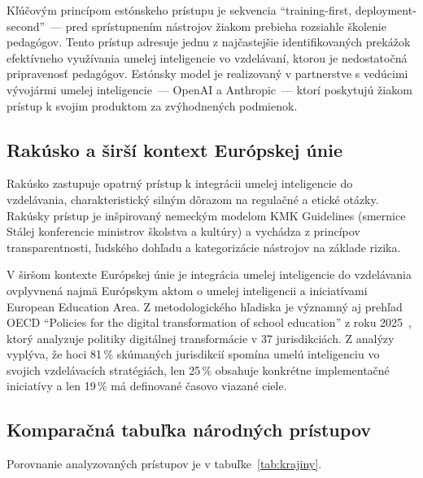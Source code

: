 Kľúčovým princípom estónskeho prístupu je sekvencia \enquote{training-first, deployment-second}~--- pred sprístupnením nástrojov žiakom prebieha rozsiahle školenie pedagógov. Tento prístup adresuje jednu z najčastejšie identifikovaných prekážok efektívneho využívania umelej inteligencie vo vzdelávaní, ktorou je nedostatočná pripravenosť pedagógov. Estónsky model je realizovaný v partnerstve s vedúcimi vývojármi umelej inteligencie~--- OpenAI a Anthropic~--- ktorí poskytujú žiakom prístup k svojim produktom za zvýhodnených podmienok.


\subsection{Rakúsko a širší kontext Európskej únie}

Rakúsko zastupuje opatrný prístup k integrácii umelej inteligencie do vzdelávania, charakteristický silným dôrazom na regulačné a etické otázky. Rakúsky prístup je inšpirovaný nemeckým modelom KMK Guidelines (smernice Stálej konferencie ministrov školstva a kultúry) a vychádza z princípov transparentnosti, ľudského dohľadu a kategorizácie nástrojov na základe rizika.

V širšom kontexte Európskej únie je integrácia umelej inteligencie do vzdelávania ovplyvnená najmä Európskym aktom o umelej inteligencii a iniciatívami European Education Area. Z metodologického hľadiska je významný aj prehľad OECD \enquote{Policies for the digital transformation of school education} z roku 2025~\cite{oecd2025digital}, ktorý analyzuje politiky digitálnej transformácie v 37 jurisdikciách. Z analýzy vyplýva, že hoci 81\,\% skúmaných jurisdikcií spomína umelú inteligenciu vo svojich vzdelávacích stratégiách, len 25\,\% obsahuje konkrétne implementačné iniciatívy a len 19\,\% má definované časovo viazané ciele.


\subsection{Komparačná tabuľka národných prístupov}

Porovnanie analyzovaných prístupov je v tabuľke~\ref{tab:krajiny}.

